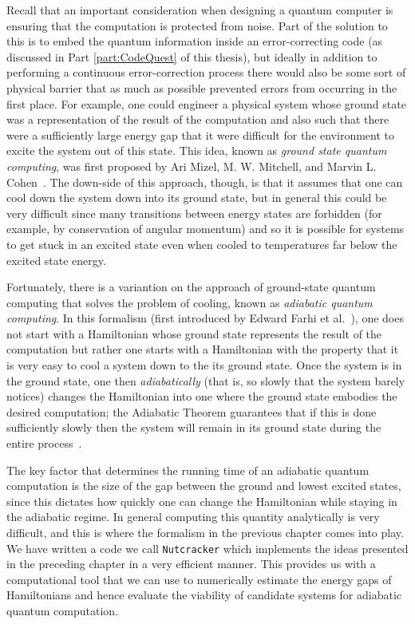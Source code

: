 \documentclass[12pt]{amsbook}
\theoremstyle{plain}
\theoremstyle{definition}
\theoremstyle{remark}
\begin{document}
Recall that an important consideration when designing a quantum computer is ensuring that the computation is protected from noise.  Part of the solution to this is to embed the quantum information inside an error-correcting code (as discussed in Part \ref{part:CodeQuest} of this thesis), but ideally in addition to performing a continuous error-correction process there would also be some sort of physical barrier that as much as possible prevented errors from occurring in the first place.  For example, one could engineer a physical system whose ground state was a representation of the result of the computation and also such that there were a sufficiently large energy gap that it were difficult for the environment to excite the system out of this state.  This idea, known as \emph{ground state quantum computing}, was first proposed by Ari Mizel, M. W. Mitchell, and Marvin L. Cohen~\cite{PhysRevA.63.040302}.  The down-side of this approach, though, is that it assumes that one can cool down the system down into its ground state, but in general this could be very difficult since many transitions between energy states are forbidden (for example, by conservation of angular momentum) and so it is possible for systems to get stuck in an excited state even when cooled to temperatures far below the excited state energy.

Fortunately, there is a variantion on the approach of ground-state quantum computing that solves the problem of cooling, known as \emph{adiabatic quantum computing}.  In this formalism (first introduced by Edward Farhi et al.~\cite{Farhi2000}), one does not start with a Hamiltonian whose ground state represents the result of the computation but rather one starts with a Hamiltonian with the property that it is very easy to cool a system down to the its ground state.   Once the system is in the ground state, one then \emph{adiabatically} (that is, so slowly that the system barely notices) changes the Hamiltonian into one where the ground state embodies the desired computation;  the Adiabatic Theorem guarantees that if this is done sufficiently slowly then the system will remain in its ground state during the entire process~\cite{JPSJ.5.435}.

The key factor that determines the running time of an adiabatic quantum computation is the size of the gap between the ground and lowest excited states, since this dictates how quickly one can change the Hamiltonian while staying in the adiabatic regime.  In general computing this quantity analytically is very difficult, and this is where the formalism in the previous chapter comes into play.  We have written a code we call \texttt{Nutcracker} which implements the ideas presented in the preceding chapter in a very efficient manner.  This provides us with a computational tool that we can use to numerically estimate the energy gaps of Hamiltonians and hence evaluate the viability of candidate systems for adiabatic quantum computation.
\end{document}

